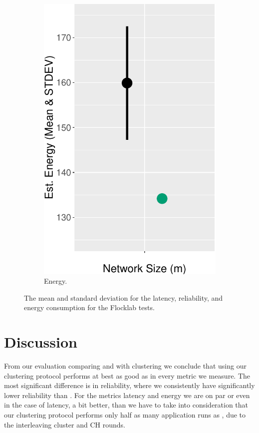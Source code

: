 \begin{figure}[bt]
\begin{subfigure}{0.32\textwidth}
        \includegraphics[width=\textwidth, keepaspectratio]{figure/Results/ChaosComparison/Flocklab/FlocklabComparison_Energy.pdf}
        \caption{Energy.}
        \label{subfig:flocklab-energy}
    \end{subfigure}
    \caption{The mean and standard deviation for the latency, reliability, and energy consumption for the Flocklab tests.}
    \label{fig:flocklab-results}
\end{figure}

\section{Discussion}
From our evaluation comparing \atwo{} and \atwo{} with clustering we conclude that using our clustering protocol performs at best as good as \atwo{} in every metric we measure. The most significant difference is in reliability, where we consistently have significantly lower reliability than \atwo{}. For the metrics latency and energy we are on par or even in the case of latency, a bit better, than \atwo{} we have to take into consideration that our clustering protocol performs only half as many application runs as \atwo{}, due to the interleaving cluster and CH rounds.


